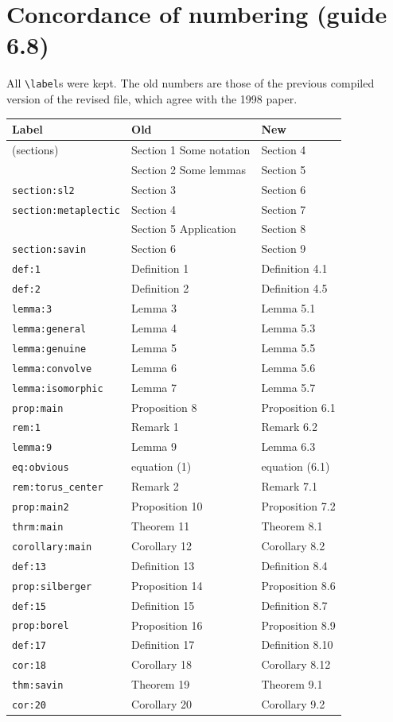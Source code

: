\documentclass[12pt,letterpaper]{amsart}
\begin{document}
\section{Concordance of numbering (guide 6.8)}

All \verb|\label|s were kept. The old numbers are those of the previous
compiled version of the revised file, which agree with the 1998 paper.

\begin{center}
\begin{longtable}{lll}
Label & Old & New\\ \hline
(sections) & Section 1 Some notation & Section 4\\
& Section 2 Some lemmas & Section 5\\
\texttt{section:sl2} & Section 3 & Section 6\\
\texttt{section:metaplectic} & Section 4 & Section 7\\
& Section 5 Application & Section 8\\
\texttt{section:savin} & Section 6 & Section 9\\
\texttt{def:1} & Definition 1 & Definition 4.1\\
\texttt{def:2} & Definition 2 & Definition 4.5\\
\texttt{lemma:3} & Lemma 3 & Lemma 5.1\\
\texttt{lemma:general} & Lemma 4 & Lemma 5.3\\
\texttt{lemma:genuine} & Lemma 5 & Lemma 5.5\\
\texttt{lemma:convolve} & Lemma 6 & Lemma 5.6\\
\texttt{lemma:isomorphic} & Lemma 7 & Lemma 5.7\\
\texttt{prop:main} & Proposition 8 & Proposition 6.1\\
\texttt{rem:1} & Remark 1 & Remark 6.2\\
\texttt{lemma:9} & Lemma 9 & Lemma 6.3\\
\texttt{eq:obvious} & equation (1) & equation (6.1)\\
\texttt{rem:torus\_center} & Remark 2 & Remark 7.1\\
\texttt{prop:main2} & Proposition 10 & Proposition 7.2\\
\texttt{thrm:main} & Theorem 11 & Theorem 8.1\\
\texttt{corollary:main} & Corollary 12 & Corollary 8.2\\
\texttt{def:13} & Definition 13 & Definition 8.4\\
\texttt{prop:silberger} & Proposition 14 & Proposition 8.6\\
\texttt{def:15} & Definition 15 & Definition 8.7\\
\texttt{prop:borel} & Proposition 16 & Proposition 8.9\\
\texttt{def:17} & Definition 17 & Definition 8.10\\
\texttt{cor:18} & Corollary 18 & Corollary 8.12\\
\texttt{thm:savin} & Theorem 19 & Theorem 9.1\\
\texttt{cor:20} & Corollary 20 & Corollary 9.2\\
\end{longtable}
\end{center}
\end{document}
